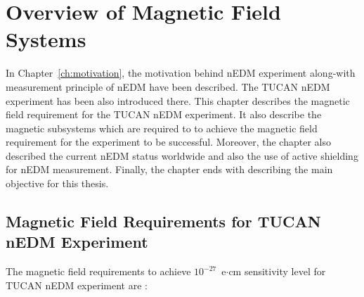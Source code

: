 \chapter{Overview of Magnetic Field Systems}\label{ch:magnetics}



In Chapter~\ref{ch:motivation}, the motivation behind nEDM experiment along-with measurement principle of nEDM have been described. The TUCAN nEDM experiment has been also introduced there. This chapter describes the magnetic field requirement for the TUCAN nEDM experiment. It also describe the magnetic subsystems which are required to to achieve the magnetic field requirement for the experiment to be successful. Moreover, the chapter also described the current nEDM status worldwide and also the use of active shielding for nEDM measurement. Finally, the chapter ends with  describing the main objective for this thesis. 


\section{Magnetic Field Requirements for TUCAN nEDM Experiment}\label{sec:msr}

The magnetic field requirements to achieve $10^{-27}$~e$\cdot$cm sensitivity level for TUCAN nEDM experiment are :

